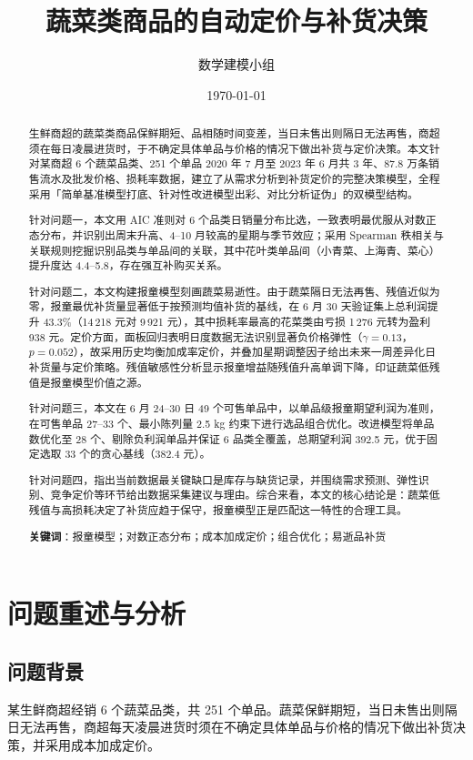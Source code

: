 \documentclass[12pt]{ctexart}
\title{\bfseries 蔬菜类商品的自动定价与补货决策}
\author{数学建模小组}
\date{\today}
\begin{document}
\maketitle

\begin{abstract}
生鲜商超的蔬菜类商品保鲜期短、品相随时间变差，当日未售出则隔日无法再售，商超须在每日凌晨进货时，于不确定具体单品与价格的情况下做出补货与定价决策。本文针对某商超 6 个蔬菜品类、251 个单品 2020 年 7 月至 2023 年 6 月共 3 年、87.8 万条销售流水及批发价格、损耗率数据，建立了从需求分析到补货定价的完整决策模型，全程采用「简单基准模型打底、针对性改进模型出彩、对比分析证伪」的双模型结构。

针对问题一，本文用 AIC 准则对 6 个品类日销量分布比选，一致表明最优服从对数正态分布，并识别出周末升高、4--10 月较高的星期与季节效应；采用 Spearman 秩相关与关联规则挖掘识别品类与单品间的关联，其中花叶类单品间（小青菜、上海青、菜心）提升度达 4.4--5.8，存在强互补购买关系。

针对问题二，本文构建报童模型刻画蔬菜易逝性。由于蔬菜隔日无法再售、残值近似为零，报童最优补货量显著低于按预测均值补货的基线，在 6 月 30 天验证集上总利润提升 43.3\%（14\,218 元对 9\,921 元），其中损耗率最高的花菜类由亏损 1\,276 元转为盈利 938 元。定价方面，面板回归表明日度数据无法识别显著负价格弹性（$\gamma=0.13$，$p=0.052$），故采用历史均衡加成率定价，并叠加星期调整因子给出未来一周差异化日补货量与定价策略。残值敏感性分析显示报童增益随残值升高单调下降，印证蔬菜低残值是报童模型价值之源。

针对问题三，本文在 6 月 24--30 日 49 个可售单品中，以单品级报童期望利润为准则，在可售单品 27--33 个、最小陈列量 2.5 kg 约束下进行选品组合优化。改进模型将单品数优化至 28 个、剔除负利润单品并保证 6 品类全覆盖，总期望利润 392.5 元，优于固定选取 33 个的贪心基线（382.4 元）。

针对问题四，指出当前数据最关键缺口是库存与缺货记录，并围绕需求预测、弹性识别、竞争定价等环节给出数据采集建议与理由。综合来看，本文的核心结论是：蔬菜低残值与高损耗决定了补货应趋于保守，报童模型正是匹配这一特性的合理工具。

\textbf{关键词}：报童模型；对数正态分布；成本加成定价；组合优化；易逝品补货
\end{abstract}

\tableofcontents
\newpage

\section{问题重述与分析}

\subsection{问题背景}
某生鲜商超经销 6 个蔬菜品类，共 251 个单品。蔬菜保鲜期短，当日未售出则隔日无法再售，商超每天凌晨进货时须在不确定具体单品与价格的情况下做出补货决策，并采用成本加成定价。
\end{document}
